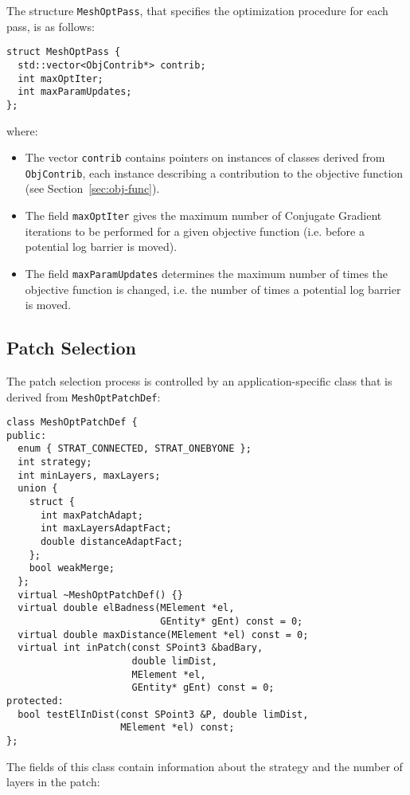 \documentclass[12pt,a4paper,a4wide]{article}
\begin{document}
The structure \texttt{MeshOptPass}, that specifies the optimization
procedure for each pass, is as follows:

\begin{verbatim}
struct MeshOptPass {
  std::vector<ObjContrib*> contrib;
  int maxOptIter;
  int maxParamUpdates;
};
\end{verbatim}

where:

\begin{itemize}
\item The vector \texttt{contrib} contains pointers on instances
of classes derived from \texttt{ObjContrib}, each instance
describing a contribution to the objective function (see
Section~\ref{sec:obj-func}).
\item The field \texttt{maxOptIter} gives the maximum number of
Conjugate Gradient iterations to be performed for a given objective
function (i.e. before a potential log barrier is moved).
\item The field \texttt{maxParamUpdates} determines the maximum
number of times the objective function is changed, i.e. the number
of times a potential log barrier is moved.
\end{itemize}


\subsection{Patch Selection}\label{sec:patch-selec}

The patch selection process is controlled by an application-specific
class that is derived from \texttt{MeshOptPatchDef}:

\begin{verbatim}
class MeshOptPatchDef {
public:
  enum { STRAT_CONNECTED, STRAT_ONEBYONE };
  int strategy;
  int minLayers, maxLayers;
  union {
    struct {
      int maxPatchAdapt;
      int maxLayersAdaptFact;
      double distanceAdaptFact;
    };
    bool weakMerge;
  };
  virtual ~MeshOptPatchDef() {}
  virtual double elBadness(MElement *el,
                           GEntity* gEnt) const = 0;
  virtual double maxDistance(MElement *el) const = 0;
  virtual int inPatch(const SPoint3 &badBary,
                      double limDist,
                      MElement *el,
                      GEntity* gEnt) const = 0;
protected:
  bool testElInDist(const SPoint3 &P, double limDist,
                    MElement *el) const;
};
\end{verbatim}

The fields of this class contain information about the strategy
and the number of layers in the patch:
\end{document}
